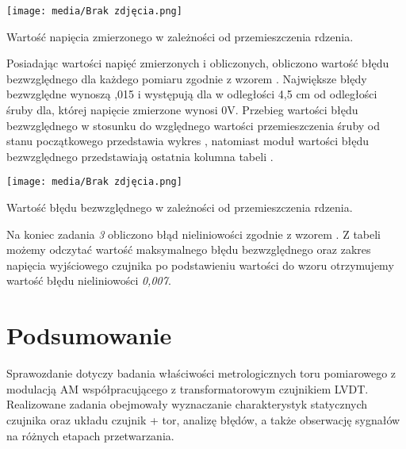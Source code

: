 \documentclass{article}
\begin{document}
\begin{graph}[ht]
    \centering
    \texttt{[image: media/Brak zdjęcia.png]}
    \caption{Wartość napięcia zmierzonego w zależności od przemieszczenia rdzenia.}
    \label{wyk3}
\end{graph}
\newpage
Posiadając wartości napięć zmierzonych i obliczonych, obliczono wartość błędu bezwzględnego dla każdego pomiaru zgodnie z wzorem . Największe błędy bezwzględne wynoszą ,015 i występują dla w odległości 4,5 cm od odległości śruby dla, której napięcie zmierzone wynosi 0V. Przebieg wartości błędu bezwzględnego w stosunku do względnego wartości przemieszczenia śruby od stanu początkowego przedstawia wykres , natomiast moduł wartości błędu bezwzględnego przedstawiają ostatnia kolumna tabeli .

\begin{graph}[ht]
    \centering
    \texttt{[image: media/Brak zdjęcia.png]}
    \caption{Wartość błędu bezwzględnego w zależności od przemieszczenia rdzenia.}
    \label{wyk4}
\end{graph}
Na koniec zadania \textit{3} obliczono błąd nieliniowości zgodnie z wzorem . Z tabeli możemy odczytać wartość maksymalnego błędu bezwzględnego oraz zakres napięcia wyjściowego czujnika po podstawieniu wartości do wzoru otrzymujemy wartość błędu nieliniowości \textit{0,007}.
\newpage

\section{Podsumowanie}
Sprawozdanie dotyczy badania właściwości metrologicznych toru pomiarowego z modulacją AM współpracującego z transformatorowym czujnikiem LVDT. Realizowane zadania obejmowały wyznaczanie charakterystyk statycznych czujnika oraz układu czujnik + tor, analizę błędów, a także obserwację sygnałów na różnych etapach przetwarzania.
\end{document}
